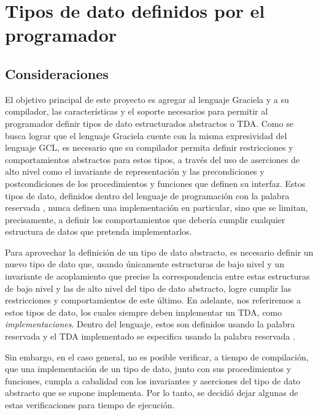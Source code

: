 {{%
\section{Tipos de dato definidos por el programador}


\subsection{Consideraciones}

El objetivo principal de este proyecto es agregar al lenguaje Graciela y a su
compilador, las características y el soporte necesarios para permitir al
programador definir tipos de dato estructurados abstractos o TDA. Como se busca
lograr que el lenguaje Graciela cuente con la misma expresividad del lenguaje
GCL, es necesario que su compilador permita definir restricciones y
comportamientos abstractos para estos tipos, a través del uso de aserciones de
alto nivel como el invariante de representación y las precondiciones y
postcondiciones de los procedimientos y funciones que definen su interfaz.
Estos tipos de dato, definidos dentro del lenguaje de programación con la
palabra reservada , nunca definen una implementación en
particular, sino que se limitan, precisamente, a definir los comportamientos que
debería cumplir cualquier estructura de datos que pretenda implementarlos.

Para aprovechar la definición de un tipo de dato abstracto, es necesario definir
un nuevo tipo de dato que, usando únicamente estructuras de bajo nivel y un
invariante de acoplamiento que precise la correspondencia entre estas
estructuras de bajo nivel y las de alto nivel del tipo de dato abstracto, logre
cumplir las restricciones y comportamientos de este último. En adelante, nos
referiremos a estos tipos de dato, los cuales siempre deben implementar un TDA,
como \textit{implementaciones}. Dentro del lenguaje, estos son definidos usando
la palabra reservada  y el TDA implementado se especifica usando la
palabra reservada .

Sin embargo, en el caso general, no es posible verificar, a tiempo de
compilación, que una implementación de un tipo de dato, junto con sus
procedimientos y funciones, cumpla a cabalidad con los invariantes y aserciones
del tipo de dato abstracto que se supone implementa. Por lo tanto, se decidió
dejar algunas de estas verificaciones para tiempo de ejecución.

}}
